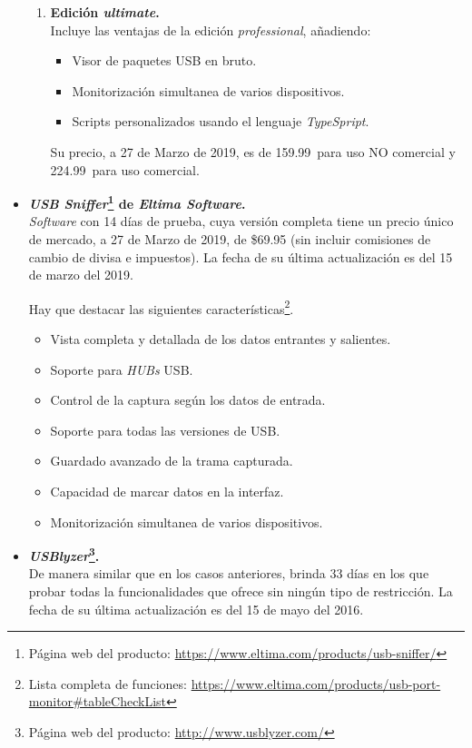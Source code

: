 \begin{itemize}
\begin{enumerate}
        \item \textbf{Edición \emph{ultimate}.} \\
        Incluye las ventajas de la edición \emph{professional}, añadiendo:
        \begin{itemize}
            \item Visor de paquetes USB en bruto.
            \item Monitorización simultanea de varios dispositivos.
            \item Scripts personalizados usando el lenguaje \emph{TypeSpript}.
        \end{itemize}
        Su precio, a 27 de Marzo de 2019, es de 159.99\texteuro ~para uso NO comercial y 224.99\texteuro ~para uso comercial.
    \end{enumerate}

    \item \textbf{\emph{USB Sniffer}\footnote{Página web del producto: \url{https://www.eltima.com/products/usb-sniffer/}} de \emph{Eltima Software}.} \\
    \emph{Software} con 14 días de prueba, cuya versión completa tiene un precio único de mercado, a 27 de Marzo de 2019, de \$69.95 (sin incluir comisiones de cambio de divisa e impuestos). La fecha de su última actualización es del 15 de marzo del 2019.
    
    Hay que destacar las siguientes características\footnote{Lista completa de funciones: \url{https://www.eltima.com/products/usb-port-monitor\#tableCheckList}}.

    \begin{itemize}
        \item Vista completa y detallada de los datos entrantes y salientes.
        \item Soporte para \emph{HUBs} USB.
        \item Control de la captura según los datos de entrada.
        \item Soporte para todas las versiones de USB.
        \item Guardado avanzado de la trama capturada.
        \item Capacidad de marcar datos en la interfaz.
        \item Monitorización simultanea de varios dispositivos.
    \end{itemize}

    \item \textbf{\emph{USBlyzer}\footnote{Página web del producto: \url{http://www.usblyzer.com/}}.} \\
    De manera similar que en los casos anteriores, brinda 33 días en los que probar todas la funcionalidades que ofrece sin ningún tipo de restricción. La fecha de su última actualización es del 15 de mayo del 2016.


\end{itemize}
